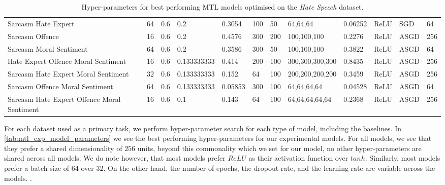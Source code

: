 \begin{landscape}
\begin{table}[]
\begin{tabular}{l|lllllllllll}
      Sarcasm Hate Expert                         & 64         & 0.6              & 0.2              & 0.3054  & 100           & 50     & 64,64,64        & 0.06252       & ReLU          & SGD       & 64         \\
      Sarcasm Offence                             & 16         & 0.6              & 0.2              & 0.4576  & 300           & 200    & 100,100,100     & 0.2276        & ReLU          & ASGD      & 256        \\
      Sarcasm Moral Sentiment                     & 64         & 0.6              & 0.2              & 0.3586  & 300           & 50     & 100,100,100     & 0.3822        & ReLU          & ASGD      & 64         \\
      Hate Expert Offence Moral Sentiment         & 16         & 0.6              & 0.133333333      & 0.414   & 200           & 100    & 300,300,300,300 & 0.8435        & ReLU          & ASGD      & 256        \\
      Sarcasm Hate Expert Moral Sentiment         & 32         & 0.6              & 0.133333333      & 0.152   & 64            & 100    & 200,200,200,200 & 0.3459        & ReLU          & ASGD      & 256        \\
      Sarcasm Offence Moral Sentiment             & 64         & 0.6              & 0.133333333      & 0.05853 & 300           & 100    & 64,64,64,64     & 0.04528       & ReLU          & ASGD      & 64         \\
      Sarcasm Hate Expert Offence Moral Sentiment & 16         & 0.6              & 0.1              & 0.143   & 64            & 100    & 64,64,64,64,64  & 0.2368        & ReLU          & ASGD      & 256
    \end{tabular}
    \caption{Hyper-parameters for best performing MTL models optimised on the \textit{Hate Speech} dataset.}
    \label{tab:mtl_params_wh}
  \end{table}
\end{landscape}


For each dataset used as a primary task, we perform hyper-parameter search for each type of model, including the baselines.
In \autoref{tab:mtl_exp_model_parameters} we see the best performing hyper-parameters for our experimental models.
For all models, we see that they prefer a shared dimensionality of $256$ units, beyond this commonality which we set for our model, no other hyper-parameters are shared across all models.
We do note however, that most models prefer $ReLU$ as their activation function over $tanh$.
Similarly, most models prefer a batch size of $64$ over $32$.
On the other hand, the number of epochs, the dropout rate, and the learning rate are variable across the models.
.

